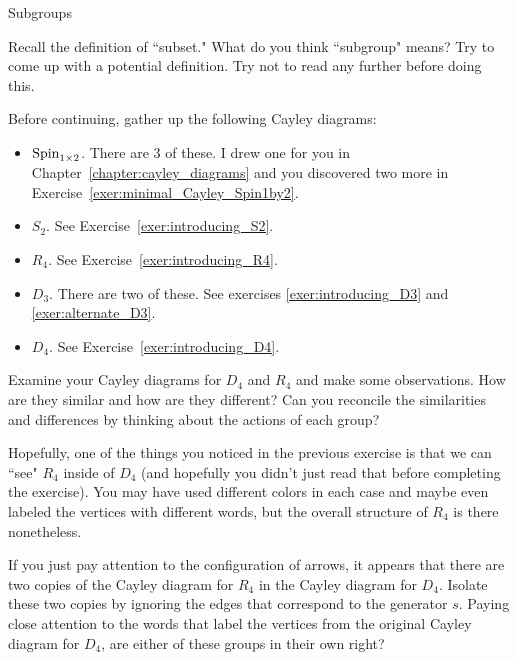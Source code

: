 \begin{section}{Subgroups}\label{sec:intuitive_subgroups}

\begin{exercise}
Recall the definition of ``subset."  What do you think ``subgroup" means?  Try to come up with a potential definition.  Try not to read any further before doing this.
\end{exercise}

Before continuing, gather up the following Cayley diagrams:
\begin{itemize}
\item $\operatorname{Spin}_{1\times 2}$. There are 3 of these.  I drew one for you in Chapter~\ref{chapter:cayley_diagrams} and you discovered two more in Exercise~\ref{exer:minimal_Cayley_Spin1by2}.
\item $S_2$.  See Exercise~\ref{exer:introducing_S2}.
\item $R_4$.  See Exercise~\ref{exer:introducing_R4}.
\item $D_3$.  There are two of these.  See exercises \ref{exer:introducing_D3} and \ref{exer:alternate_D3}.
\item $D_4$.  See Exercise~\ref{exer:introducing_D4}.
\end{itemize}

\begin{exercise}\label{exer:R4_in_D4}
Examine your Cayley diagrams for $D_4$ and $R_4$ and make some observations.  How are they similar and how are they different?  Can you reconcile the similarities and differences by thinking about the actions of each group?
\end{exercise}

Hopefully, one of the things you noticed in the previous exercise is that we can ``see" $R_4$ inside of $D_4$ (and hopefully you didn't just read that before completing the exercise).  You may have used different colors in each case and maybe even labeled the vertices with different words, but the overall structure of $R_4$ is there nonetheless.

\begin{exercise}\label{exer:R4_subgroup_D_4}
If you just pay attention to the configuration of arrows, it appears that there are two copies of the Cayley diagram for $R_4$ in the Cayley diagram for $D_4$.  Isolate these two copies by ignoring the edges that correspond to the generator $s$.  Paying close attention to the words that label the vertices from the original Cayley diagram for $D_4$, are either of these groups in their own right?
\end{exercise}


\end{section}
